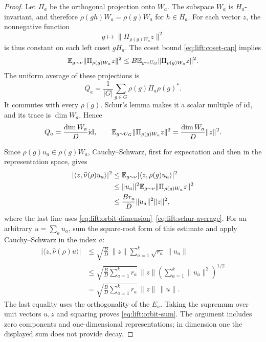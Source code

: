 \begin{proof}
Let \(\Pi_a\) be the orthogonal projection onto \(W_a\). The subspace
\(W_a\) is \(H_a\)-invariant, and therefore
\(\rho(gh)W_a=\rho(g)W_a\) for \(h\in H_a\). For each vector \(z\),
the nonnegative function
\[
  g\longmapsto
       \|\Pi_{\rho(g)W_a}z\|^2
\]
is thus constant on each left coset \(gH_a\). The coset bound
\eqref{eq:lift:coset-cap} implies
\begin{equation}
\label{eq:lift:projection-comparison}
  \mathbb E_{g\sim\nu}\|\Pi_{\rho(g)W_a}z\|^2
  \le B\mathbb E_{g\sim U_G}\|\Pi_{\rho(g)W_a}z\|^2.
\end{equation}
The uniform average of these projections is
\[
  Q_a=\frac1{|G|}\sum_{g\in G}\rho(g)\Pi_a\rho(g)^*.
\]
It commutes with every \(\rho(g)\). Schur's lemma makes it a scalar
multiple of \(\mathrm{id}\), and its trace is \(\dim W_a\). Hence
\begin{equation}
\label{eq:lift:schur-average}
  Q_a=\frac{\dim W_a}{D}\mathrm{id},
  \qquad
  \mathbb E_{g\sim U_G}\|\Pi_{\rho(g)W_a}z\|^2
       =\frac{\dim W_a}{D}\|z\|^2.
\end{equation}

Since \(\rho(g)u_a\in\rho(g)W_a\), Cauchy--Schwarz, first for
expectation and then in the representation space, gives
\begin{align}
  |\langle z,\widehat\nu(\rho)u_a\rangle|^2
  &\le \mathbb E_{g\sim\nu}|\langle z,\rho(g)u_a\rangle|^2 \notag\\
  &\le \|u_a\|^2
           \mathbb E_{g\sim\nu}\|\Pi_{\rho(g)W_a}z\|^2 \notag\\
  &\le \frac{Br_a}{D}\|u_a\|^2\|z\|^2,
\label{eq:lift:component-bound}
\end{align}
where the last line uses
\eqref{eq:lift:orbit-dimension}--\eqref{eq:lift:schur-average}.
For an arbitrary \(u=\sum_a u_a\), sum the square-root form of this
estimate and apply Cauchy--Schwarz in the index \(a\):
\begin{align*}
 |\langle z,\widehat\nu(\rho)u\rangle|
 &\le \sqrt{\frac{B}{D}}\,\|z\|
           \sum_{a=1}^k\sqrt{r_a}\,\|u_a\|\\
 &\le \sqrt{\frac{B}{D}\sum_{a=1}^k r_a}\,\|z\|
           \left(\sum_{a=1}^k\|u_a\|^2\right)^{1/2}\\
 &=\sqrt{\frac{B}{D}\sum_{a=1}^k r_a}\,\|z\|\,\|u\|.
\end{align*}
The last equality uses the orthogonality of the \(E_a\). Taking the
supremum over unit vectors \(u,z\) and squaring proves
\eqref{eq:lift:orbit-sum}. The argument includes zero components and
one-dimensional representations; in dimension one the displayed sum
does not provide decay.
\end{proof}
